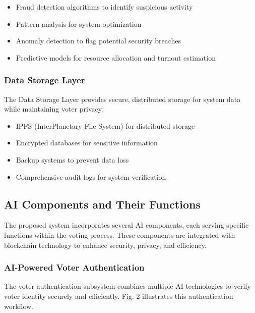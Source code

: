 \documentclass[conference]{IEEEtran}
\begin{document}
\begin{itemize}
    \item Fraud detection algorithms to identify suspicious activity
    \item Pattern analysis for system optimization
    \item Anomaly detection to flag potential security breaches
    \item Predictive models for resource allocation and turnout estimation
\end{itemize}

\subsubsection{Data Storage Layer}
The Data Storage Layer provides secure, distributed storage for system data while maintaining voter privacy:

\begin{itemize}
    \item IPFS (InterPlanetary File System) for distributed storage
    \item Encrypted databases for sensitive information
    \item Backup systems to prevent data loss
    \item Comprehensive audit logs for system verification
\end{itemize}

\subsection{AI Components and Their Functions}
The proposed system incorporates several AI components, each serving specific functions within the voting process. These components are integrated with blockchain technology to enhance security, privacy, and efficiency.

\subsubsection{AI-Powered Voter Authentication}
The voter authentication subsystem combines multiple AI technologies to verify voter identity securely and efficiently. Fig. 2 illustrates this authentication workflow.
\end{document}
